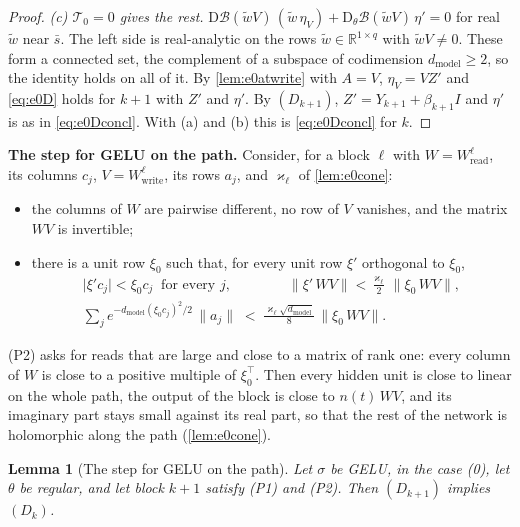 \documentclass[10pt]{article}
\newtheorem{lemma}[theorem]{Lemma}
\theoremstyle{definition}
\theoremstyle{remark}
\newcommand{\R}{\mathbb{R}}
\newcommand{\Wread}{W_{\mathrm{read}}}
\newcommand{\Wwrite}{W_{\mathrm{write}}}
\newcommand{\dm}{d_{\mathrm{model}}}
\newcommand{\Der}{\mathrm{D}}
\newcommand{\norm}[1]{\lVert #1\rVert}
\newcommand{\para}[1]{\smallskip\noindent\textbf{#1}\hspace{0.5em}}
\begin{document}
\begin{proof}
\emph{(c) $\mathcal T_0 = 0$ gives the rest.} $\Der\mathcal B(\tilde wV)\,(\tilde w\,\eta_V) + \Der_\theta\mathcal B(\tilde wV)\,\eta' = 0$ for real $\tilde w$ near $\bar s$. The left side is real-analytic on the rows $\tilde w \in \R^{1\times q}$ with $\tilde wV \neq 0$. These form a connected set, the complement of a subspace of codimension $\dm \ge 2$, so the identity holds on all of it. By \cref{lem:e0atwrite} with $A = V$, $\eta_V = VZ'$ and \eqref{eq:e0D} holds for $k+1$ with $Z'$ and $\eta'$. By $(D_{k+1})$, $Z' = Y_{k+1} + \beta_{k+1}I$ and $\eta'$ is as in \eqref{eq:e0Dconcl}. With (a) and (b) this is \eqref{eq:e0Dconcl} for $k$.
\end{proof}

\para{The step for GELU on the path.} Consider, for a block $\ell$ with $W = \Wread^{\ell}$, its columns $c_j$, $V = \Wwrite^{\ell}$, its rows $a_j$, and $\varkappa_\ell$ of \cref{lem:e0cone}:
\begin{itemize}[leftmargin=2.9em]
\item[(P1)] the columns of $W$ are pairwise different, no row of $V$ vanishes, and the matrix $WV$ is invertible;
\item[(P2)] there is a unit row $\xi_0$ such that, for every unit row $\xi'$ orthogonal to $\xi_0$,
\begin{gather*}
\lvert\xi'c_j\rvert < \xi_0c_j \ \text{ for every } j, \qquad\qquad
\norm{\xi'\,WV} < \frac{\varkappa_\ell}{2}\,\norm{\xi_0\,WV}, \\
\sum_{j}e^{-\dm(\xi_0c_j)^2/2}\,\norm{a_j} \;<\; \frac{\varkappa_\ell\sqrt{\dm}}{8}\,\norm{\xi_0\,WV} .
\end{gather*}
\end{itemize}
(P2) asks for reads that are large and close to a matrix of rank one: every column of $W$ is close to a positive multiple of $\xi_0^\top$. Then every hidden unit is close to linear on the whole path, the output of the block is close to $n(t)\,WV$, and its imaginary part stays small against its real part, so that the rest of the network is holomorphic along the path (\cref{lem:e0cone}).

\begin{lemma}[The step for GELU on the path]\label{lem:e0stepgelu}
Let $\sigma$ be GELU, in the case (0), let $\theta$ be regular, and let block $k+1$ satisfy (P1) and (P2). Then $(D_{k+1})$ implies $(D_k)$.
\end{lemma}
\end{document}
